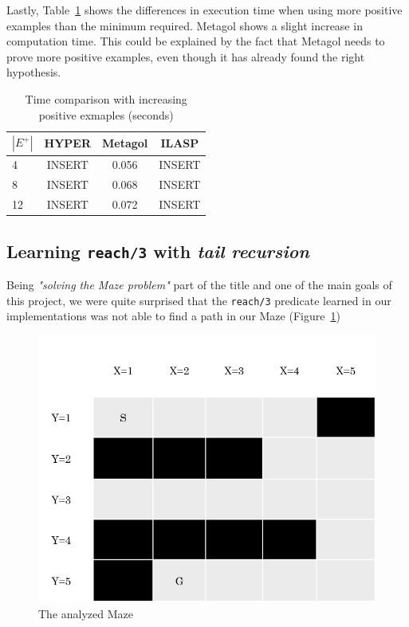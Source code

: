 Lastly, Table~\ref{tab:ex_cmp} shows the differences in execution time when using more positive examples than the minimum required. Metagol shows a slight 
increase in computation time. This could be explained by the fact that Metagol needs to prove more positive examples, even though it has already
found the right hypothesis.

{
\begin{center}
    \begin{table}[h]
    \centering
    \begin{tabular}{ |l|c|c|c| } 
        \hline
        \(|E^+|\) & \textbf{HYPER} & \textbf{Metagol} & \textbf{ILASP} \\ \hline
        4 & INSERT & 0.056 & INSERT \\ 
        8 & INSERT & 0.068 & INSERT \\
        12 & INSERT & 0.072 & INSERT \\  
        \hline
    \end{tabular}
    \caption{\label{tab:ex_cmp}Time comparison with increasing positive exmaples (seconds)}
\end{table}
\end{center}
}

\subsection{Learning \texttt{reach/3} with \emph{tail recursion}}
Being \emph{"solving the Maze problem"} part of the title and one of the main goals of this project, we were
quite surprised that the \texttt{reach/3} predicate learned in our implementations was not able to find a path
in our Maze (Figure~\ref{fig:our})

\begin{figure}
    \centering
    \includegraphics[scale=0.7]{img/ourMaze.png}
    \caption{The analyzed Maze}\label{fig:our}
\end{figure}